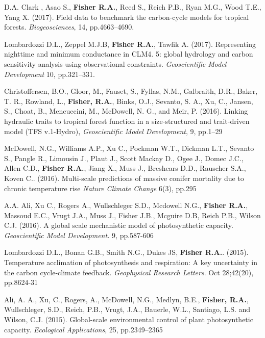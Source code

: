 \documentclass[10pt]{article}
\newenvironment{lonelist}[1][\enskip\textbullet]%
        {\vspace{-\baselineskip}\begin{list}{#1}{%
        \setlength{\itemindent}{-3pt} 
        \setlength{\partopsep}{0pt}%
        \setlength{\leftmargin}{10pt}
        \setlength{\topsep}{15pt}}}
        {\end{list}\vspace{-.3\baselineskip}}
\begin{document}
\begin{lonelist}
{\item [37] D.A. Clark ,  Asao S., \textbf{Fisher R.A.}, Reed S.,  Reich P.B., Ryan M.G., Wood T.E., Yang X. (2017). Field data to benchmark the carbon-cycle models for tropical forests. \emph{Biogeosciences}, 14, pp.4663–4690.

\item [36]  Lombardozzi D.L.,  Zeppel M.J.B, \textbf{Fisher R.A.}, Tawfik A. (2017). Representing nighttime and minimum conductance in CLM4. 5: global hydrology and carbon sensitivity analysis using observational constraints. \emph{Geoscientific Model Development} 10, pp.321–331.

\item [35] Christoffersen, B.O., Gloor, M., Fauset, S., Fyllas, N.M., Galbraith, D.R., Baker, T. R., Rowland, L., \textbf{Fisher, R.A.}, Binks, O.J., Sevanto, S. A., Xu, C., Jansen, S., Choat, B., Mencuccini, M., McDowell, N. G., and Meir, P. (2016). Linking hydraulic traits to tropical forest function in a size-structured and trait-driven model (TFS v.1-Hydro), \emph{Geoscientific Model Development}, 9, pp.1–29

\item[34]  McDowell, N.G.,  Williams A.P.,  Xu C.,  Pockman W.T., Dickman L.T., Sevanto S., Pangle R., Limousin J., Plaut J., Scott Mackay D., Ogee J., Domec J.C., Allen C.D., \textbf{Fisher R.A.}, Jiang X., Muss J.,  Breshears D.D., Rauscher S.A., Koven C..  (2016). Multi-scale predictions of massive conifer mortality due to chronic temperature rise \emph{Nature Climate Change} 6(3), pp.295

\item[33] {A.A. Ali, Xu C., Rogers A., Wullschleger S.D., Mcdowell N.G., \textbf{Fisher R.A.}, Massoud E.C., Vrugt J.A.,  Muss J.,  Fisher J.B.,  Mcguire D.B, Reich P.B.,  Wilson C.J. (2016). A global scale mechanistic model of photosynthetic capacity. \emph{Geoscientific Model Development.} 9, pp.587-606}

\item[32] {Lombardozzi D.L., Bonan G.B., Smith N.G., Dukes JS, \textbf{Fisher R.A.}. (2015). Temperature acclimation of photosynthesis and respiration: A key uncertainty in the carbon cycle‐climate feedback. \emph{Geophysical Research Letters}. Oct 28;42(20), pp.8624-31}

\item[31] {Ali, A. A., Xu, C., Rogers, A., McDowell, N.G., Medlyn, B.E., \textbf{Fisher, R.A.}, Wullschleger, S.D., Reich, P.B., Vrugt, J.A., Bauerle, W.L., Santiago, L.S. and Wilson, C.J. (2015). Global-scale environmental control of plant photosynthetic capacity. \emph{Ecological Applications}, 25, pp.2349–2365}

}
\end{lonelist}
\end{document}
